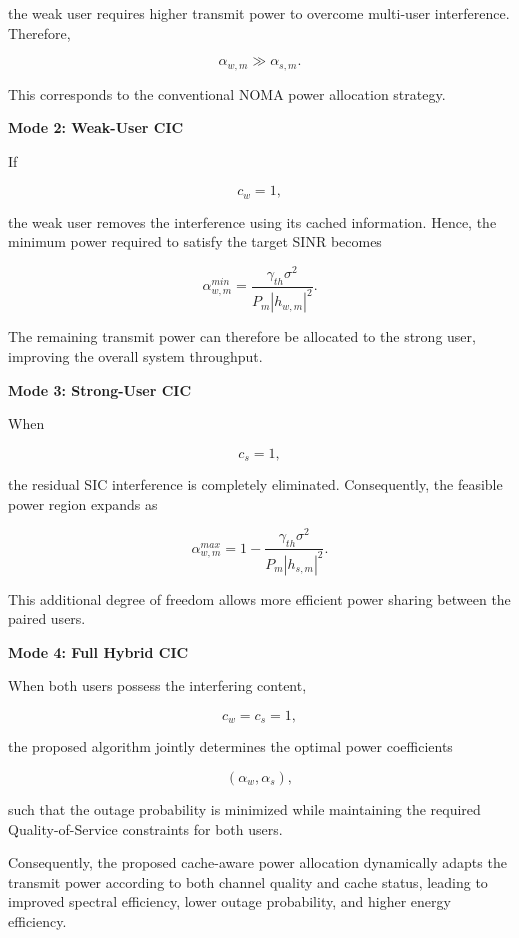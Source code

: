 \documentclass[12pt,a4paper]{article}
\begin{document}
the weak user requires higher transmit power to overcome multi-user interference. Therefore,

\begin{equation}
\alpha_{w,m}\gg\alpha_{s,m}.
\end{equation}

This corresponds to the conventional NOMA power allocation strategy.

\textbf{Mode 2: Weak-User CIC}

If

\[
c_w=1,
\]

the weak user removes the interference using its cached information. Hence, the minimum power required to satisfy the target SINR becomes

\begin{equation}
\alpha_{w,m}^{min}
=
\frac{\gamma_{th}\sigma^2}
{P_m|h_{w,m}|^2}.
\label{eq:weakpower}
\end{equation}

The remaining transmit power can therefore be allocated to the strong user, improving the overall system throughput.

\textbf{Mode 3: Strong-User CIC}

When

\[
c_s=1,
\]

the residual SIC interference is completely eliminated. Consequently, the feasible power region expands as

\begin{equation}
\alpha_{w,m}^{max}
=
1-
\frac{\gamma_{th}\sigma^2}
{P_m|h_{s,m}|^2}.
\label{eq:strongpower}
\end{equation}

This additional degree of freedom allows more efficient power sharing between the paired users.

\textbf{Mode 4: Full Hybrid CIC}

When both users possess the interfering content,

\[
c_w=c_s=1,
\]

the proposed algorithm jointly determines the optimal power coefficients

\[
(\alpha_w,\alpha_s),
\]

such that the outage probability is minimized while maintaining the required Quality-of-Service constraints for both users.

Consequently, the proposed cache-aware power allocation dynamically adapts the transmit power according to both channel quality and cache status, leading to improved spectral efficiency, lower outage probability, and higher energy efficiency.
\end{document}
